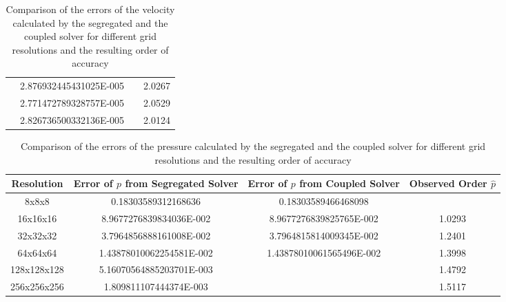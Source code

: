 \begin{table}[h!]
\begin{tabular}{cccc}
    \rowcolor{black!00}\multirow{3}{*}{}             & 2.876932445431025E-005 & & 2.0267 \\
    \rowcolor{black!00}                              & 2.771472789328757E-005 & & 2.0529 \\
    \rowcolor{black!00} \multirow{-3}{*}{256x256x256}& 2.826736500332136E-005 & & 2.0124 \\ %
  \end{tabular}
  \caption{Comparison of the errors of the velocity calculated by the segregated and the coupled solver for different grid resolutions and the resulting order of accuracy}
  \label{tab:velorder}
\end{table}

\begin{table}[h!]\centering
{}
  \begin{tabular}{cccc}\toprule
    Resolution & Error of \(p\) from Segregated Solver & Error of \(p\) from Coupled Solver & Observed Order \(\hat{p}\) \\
    \midrule
    \rowcolor{black!20} 8x8x8       & 0.18303589312168636      &  0.18303589466468098      &        \\%
    \rowcolor{black!00} 16x16x16    & 8.9677276839834036E-002  &  8.9677276839825765E-002  & 1.0293 \\%
    \rowcolor{black!20} 32x32x32    & 3.7964856888161008E-002  &  3.7964815814009345E-002  & 1.2401 \\%
    \rowcolor{black!00} 64x64x64    & 1.43878010062254581E-002 &  1.43878010061565496E-002 & 1.3998 \\%
    \rowcolor{black!20} 128x128x128 & 5.16070564885203701E-003 &                           & 1.4792 \\%
    \rowcolor{black!00} 256x256x256 & 1.809811107444374E-003   &                           & 1.5117 \\%
  \end{tabular}
  \caption{Comparison of the errors of the pressure calculated by the segregated and the coupled solver for different grid resolutions and the resulting order of accuracy}
  \label{tab:pressorder}
\end{table}

